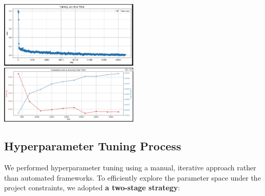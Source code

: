 \documentclass[twoside, 11pt]{article}
\begin{document}
\includegraphics[width=0.5\textwidth]{tlotime.png}
\includegraphics[width=0.5\textwidth]{elaotime.png}

\subsection{Hyperparameter Tuning Process}
We performed hyperparameter tuning using a manual, iterative approach rather than automated frameworks. To efficiently explore the parameter space under the project constraints, we adopted \textbf{a two-stage strategy}:
\end{document}
